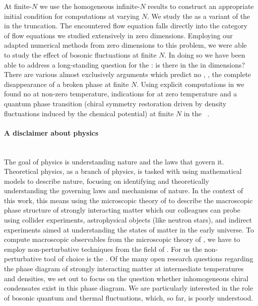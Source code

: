At finite-$N$ we use the homogeneous infinite-$N$ results to construct an appropriate initial condition for \frg{} computations at varying $N$.
We study the \gnym{} as a variant of the \gnm{} in the \lpa{} truncation.
The encountered flow equation falls directly into the category of flow equations we studied extensively in zero dimensions. 
Employing our adapted numerical methods from zero dimensions to this problem, we were able to study the effect of bosonic fluctuations at finite $N$.
In doing so we have been able to address a long-standing question for the \gnm{}: is there \csb{} in the \gnm{} in  dimensions?
There are various \dash{} almost exclusively \apriori{} arguments \dash{} which predict no \csb{}, \ie{}, the complete disappearance of a broken phase at finite $N$.
Using explicit \frg{} computations in \lpa{} we found no \csb{} at non-zero temperature, indications for \csb{} at zero temperature and a quantum phase transition (chiral symmetry restoration driven by density fluctuations induced by the chemical potential) at finite $N$ in the \gnym{}~\cite{Stoll:2021ori}.

\paragraph{A disclaimer about physics}\label{paragraph:introPhysics}\mbox{}\\%
The goal of physics is understanding nature and the laws that govern it.
Theoretical physics, as a branch of physics, is tasked with using mathematical models to describe nature, focusing on identifying and theoretically understanding the governing laws and mechanisms of nature.
In the context of this work, this means using the microscopic theory of \qcd{} to describe the macroscopic phase structure of strongly interacting matter which our colleagues can probe using collider experiments, astrophysical objects (like neutron stars), and indirect experiments aimed at understanding the states of matter in the early universe.
To compute macroscopic observables from the microscopic theory of \qcd{}, we have to employ non-perturbative techniques from the field of \qft{}.
For us the non-perturbative tool of choice is the \frg{}.
Of the many open research questions regarding the phase diagram of strongly interacting matter at intermediate temperatures and densities, we set out to focus on the question whether inhomogeneous chiral condensates exist in this phase diagram. 
We are particularly interested in the role of bosonic quantum and thermal fluctuations, which, so far, is poorly understood.

